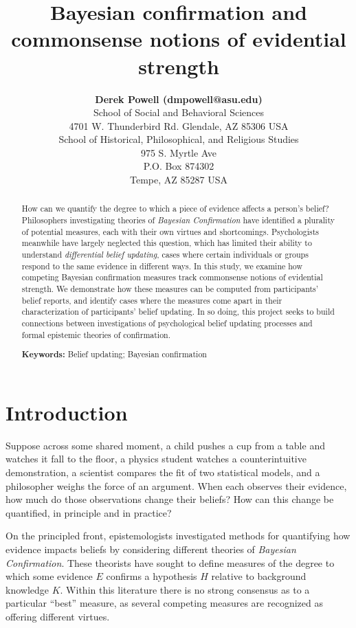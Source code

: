 \documentclass[10pt, letterpaper]{article}
\title{Bayesian confirmation and commonsense notions of evidential
strength}
\author{{\large \bf Derek Powell (dmpowell@asu.edu)} \\ School of Social and Behavioral Sciences \\ 4701 W. Thunderbird Rd. Glendale, AZ 85306 USA \AND {\large \bf Shyam Nair (gsnair@asu.edu)} \\ School of Historical, Philosophical, and Religious Studies \\ 975 S. Myrtle Ave \\ P.O. Box 874302 \\ Tempe, AZ 85287 USA}
\begin{document}
\maketitle

\begin{abstract}
How can we quantify the degree to which a piece of evidence affects a
person's belief? Philosophers investigating theories of \emph{Bayesian
Confirmation} have identified a plurality of potential measures, each
with their own virtues and shortcomings. Psychologists meanwhile have
largely neglected this question, which has limited their ability to
understand \emph{differential belief updating}, cases where certain
individuals or groups respond to the same evidence in different ways. In
this study, we examine how competing Bayesian confirmation measures
track commonsense notions of evidential strength. We demonstrate how
these measures can be computed from participants' belief reports, and
identify cases where the measures come apart in their characterization
of participants' belief updating. In so doing, this project seeks to
build connections between investigations of psychological belief
updating processes and formal epistemic theories of confirmation.

\textbf{Keywords:}
Belief updating; Bayesian confirmation
\end{abstract}

\hypertarget{introduction}{%
\section{Introduction}\label{introduction}}

Suppose across some shared moment, a child pushes a cup from a table and
watches it fall to the floor, a physics student watches a
counterintuitive demonstration, a scientist compares the fit of two
statistical models, and a philosopher weighs the force of an argument.
When each observes their evidence, how much do those observations change
their beliefs? How can this change be quantified, in principle and in
practice?

On the principled front, epistemologists investigated methods for
quantifying how evidence impacts beliefs by considering different
theories of \emph{Bayesian Confirmation}. These theorists have sought to
define measures of the degree to which some evidence \(E\) confirms a
hypothesis \(H\) relative to background knowledge \(K\). Within this
literature there is no strong consensus as to a particular ``best''
measure, as several competing measures are recognized as offering
different virtues.
\end{document}
